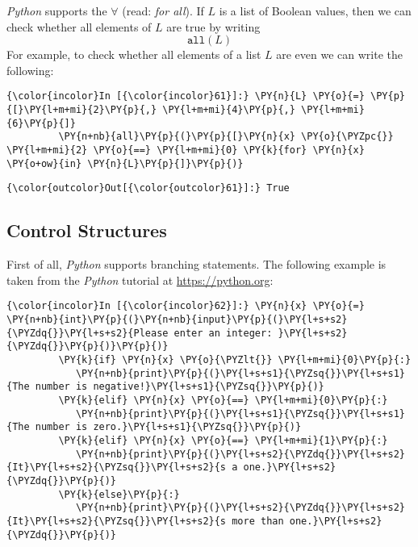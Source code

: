 \textsl{Python} supports the  \(\forall\) (read: \emph{for all}). If \(L\) is
a list of Boolean values, then we can check whether all elements of
\(L\) are true by writing \[ \texttt{all}(L) \] For example, to check
whether all elements of a list \(L\) are even we can write the
following:

\begin{Verbatim}[commandchars=\\\{\}]
{\color{incolor}In [{\color{incolor}61}]:} \PY{n}{L} \PY{o}{=} \PY{p}{[}\PY{l+m+mi}{2}\PY{p}{,} \PY{l+m+mi}{4}\PY{p}{,} \PY{l+m+mi}{6}\PY{p}{]}
         \PY{n+nb}{all}\PY{p}{(}\PY{p}{[}\PY{n}{x} \PY{o}{\PYZpc{}} \PY{l+m+mi}{2} \PY{o}{==} \PY{l+m+mi}{0} \PY{k}{for} \PY{n}{x} \PY{o+ow}{in} \PY{n}{L}\PY{p}{]}\PY{p}{)}
\end{Verbatim}


\begin{Verbatim}[commandchars=\\\{\}]
{\color{outcolor}Out[{\color{outcolor}61}]:} True
\end{Verbatim}
            
    \subsection{Control Structures}\label{control-structures}

    First of all, \textsl{Python} supports branching statements. The following
example is taken from the \textsl{Python} tutorial at \href{https://python.org}{https://python.org}:

\begin{Verbatim}[commandchars=\\\{\}]
{\color{incolor}In [{\color{incolor}62}]:} \PY{n}{x} \PY{o}{=} \PY{n+nb}{int}\PY{p}{(}\PY{n+nb}{input}\PY{p}{(}\PY{l+s+s2}{\PYZdq{}}\PY{l+s+s2}{Please enter an integer: }\PY{l+s+s2}{\PYZdq{}}\PY{p}{)}\PY{p}{)}
         \PY{k}{if} \PY{n}{x} \PY{o}{\PYZlt{}} \PY{l+m+mi}{0}\PY{p}{:}
            \PY{n+nb}{print}\PY{p}{(}\PY{l+s+s1}{\PYZsq{}}\PY{l+s+s1}{The number is negative!}\PY{l+s+s1}{\PYZsq{}}\PY{p}{)}
         \PY{k}{elif} \PY{n}{x} \PY{o}{==} \PY{l+m+mi}{0}\PY{p}{:}
            \PY{n+nb}{print}\PY{p}{(}\PY{l+s+s1}{\PYZsq{}}\PY{l+s+s1}{The number is zero.}\PY{l+s+s1}{\PYZsq{}}\PY{p}{)}
         \PY{k}{elif} \PY{n}{x} \PY{o}{==} \PY{l+m+mi}{1}\PY{p}{:}
            \PY{n+nb}{print}\PY{p}{(}\PY{l+s+s2}{\PYZdq{}}\PY{l+s+s2}{It}\PY{l+s+s2}{\PYZsq{}}\PY{l+s+s2}{s a one.}\PY{l+s+s2}{\PYZdq{}}\PY{p}{)}
         \PY{k}{else}\PY{p}{:}
            \PY{n+nb}{print}\PY{p}{(}\PY{l+s+s2}{\PYZdq{}}\PY{l+s+s2}{It}\PY{l+s+s2}{\PYZsq{}}\PY{l+s+s2}{s more than one.}\PY{l+s+s2}{\PYZdq{}}\PY{p}{)}
\end{Verbatim}


